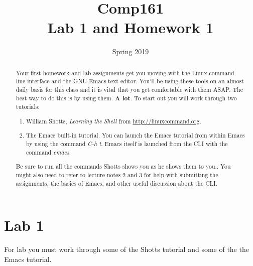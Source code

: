 \documentclass[nobib]{tufte-handout}
\title{Comp161 \\ Lab 1 and Homework 1}
\author{}
\date{ Spring 2019 }
\begin{document}
\maketitle

\begin{abstract}
Your first homework and lab assignments get you moving with the Linux command line interface and the GNU Emacs text editor.  You'll be using these tools on an almost daily basis for this class and it is vital that you get comfortable with them ASAP\@. The best way to do this is by using them.  \textbf{A lot}. To start out you will work through two tutorials:
\begin{enumerate}
\item William Shotts, \textit{Learning the Shell} from \url{http://linuxcommand.org}.
\item The Emacs built-in tutorial. You can launch the Emacs tutorial from within Emacs by using the command \textit{C-h t}.  Emacs itself is launched from the CLI with the command \textit{emacs}.
\end{enumerate}
Be sure to run all the commands Shotts shows you as he shows them to you..  You might also need to refer to lecture notes 2 and 3 for help with submitting the assignments, the basics of Emacs, and other useful discussion about the CLI\@.
\end{abstract}


\section{Lab 1}

For lab you must work through some of the  Shotts tutorial and some of the the Emacs tutorial.
\end{document}
